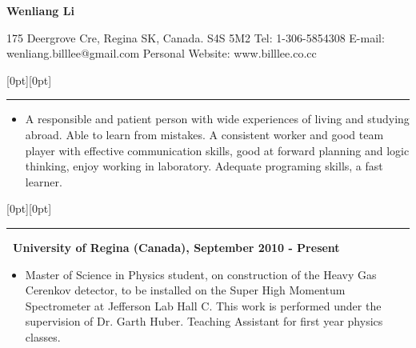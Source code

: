 \documentclass[a4paper,12pt]{letter}
\begin{document}
%
% 

\begin{center}
\textbf{\Huge Wenliang Li} \linebreak

\textrm{\normalsize 175 Deergrove Cre, Regina} \linebreak
\textrm{\normalsize SK, Canada. S4S 5M2} \linebreak
\textrm{\normalsize Tel: 1-306-5854308} \linebreak
\textrm{\normalsize E-mail: wenliang.billlee@gmail.com} \linebreak
\textrm{\normalsize Personal Website: www.billlee.co.cc}
\end{center}



\raisebox{0pt}[0pt][0pt]{\Large\textbf{\raisebox{-3.5ex}{Profile}}}

\rule[-0.5cm]{10cm}{1pt}
\begin{itemize}
\item \textrm{\normalsize A responsible and patient person with wide experiences of living and studying abroad. Able to learn from mistakes. A consistent worker and good team player with effective communication skills, good at forward planning and logic thinking, enjoy working in laboratory. Adequate programing skills, a fast learner.}
\end{itemize}

\raisebox{0pt}[0pt][0pt]{\Large\textbf{\raisebox{-3.5ex}{History of Study}}} 

\rule[-0.5cm]{10cm}{1pt}

\vspace{2mm}

\textbf{\normalsize ~University of Regina (Canada), September 2010 - Present}
\begin{itemize}
\item \textrm{\normalsize Master of Science in Physics student, on construction of the Heavy Gas
Cerenkov detector, to be installed on the Super High Momentum Spectrometer
at Jefferson Lab Hall C.  This work is performed under the supervision of
Dr. Garth Huber. Teaching Assistant for first year physics classes.}  
\end{itemize}
\end{document}
